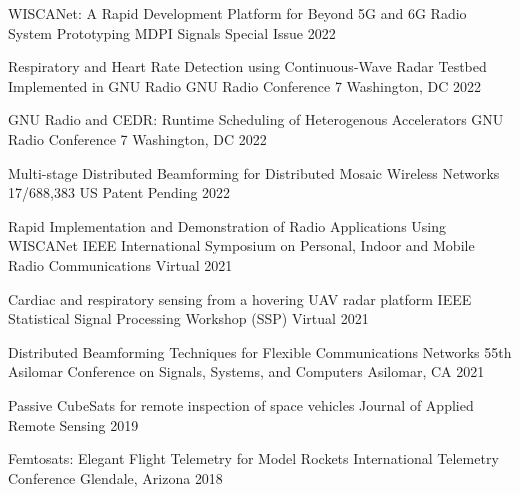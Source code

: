 
\begin{cvhonors}
    \cvhonor
    {WISCANet: A Rapid Development Platform for Beyond 5G and 6G Radio System Prototyping}
    {MDPI Signals}
    {Special Issue}
    {2022}

    \cvhonor
    {Respiratory and Heart Rate Detection using Continuous-Wave Radar Testbed Implemented in GNU Radio}
    {GNU Radio Conference 7}
    {Washington, DC}
    {2022}

    \cvhonor
    {GNU Radio and CEDR: Runtime Scheduling of Heterogenous Accelerators}
    {GNU Radio Conference 7}
    {Washington, DC}
    {2022}

    \cvhonor
    {Multi-stage Distributed Beamforming for Distributed Mosaic Wireless Networks}
    {17/688,383}
    {US Patent Pending}
    {2022}

    \cvhonor
    {Rapid Implementation and Demonstration of Radio Applications Using WISCANet}
    {IEEE International Symposium on Personal, Indoor and Mobile Radio Communications}
    {Virtual}
    {2021}

    \cvhonor
    {Cardiac and respiratory sensing from a hovering UAV radar platform}
    {IEEE Statistical Signal Processing Workshop (SSP)}
    {Virtual}
    {2021}

    \cvhonor
    {Distributed Beamforming Techniques for Flexible Communications Networks}
    {55th Asilomar Conference on Signals, Systems, and Computers}
    {Asilomar, CA}
    {2021}

  \cvhonor
  {Passive CubeSats for remote inspection of space vehicles} %
  {Journal of Applied Remote Sensing} %
  {} %
    {2019} %

  \cvhonor
  {Femtosats: Elegant Flight Telemetry for Model Rockets} %
  {International Telemetry Conference} %
  {Glendale, Arizona} %
    {2018} %

\end{cvhonors}
